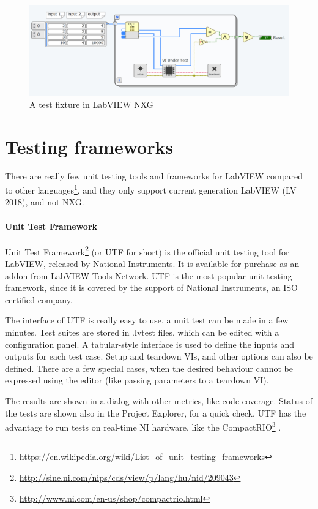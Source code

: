 \begin{figure}
\includegraphics[width=150mm,keepaspectratio]{figures/lv_testsuite.png}
\caption{A test fixture in LabVIEW NXG} 
\label{fig:selfmadetestfixture}
\end{figure}

\section{Testing frameworks}

There are really few unit testing tools and frameworks for LabVIEW compared to other languages\footnote{\url{https://en.wikipedia.org/wiki/List_of_unit_testing_frameworks}}, and they only support current generation LabVIEW (LV 2018), and not NXG.

\paragraph{Unit Test Framework}
Unit Test Framework\footnote{\url{http://sine.ni.com/nips/cds/view/p/lang/hu/nid/209043}} (or UTF for short) is the official unit testing tool for LabVIEW, released by National Instruments. It is available for purchase as an addon from LabVIEW Tools Network. UTF is the most popular unit testing framework, since it is covered by the support of National Instruments, an ISO certified company.

The interface of UTF is really easy to use, a unit test can be made in a few minutes. Test suites are stored in .lvtest files, which can be edited with a configuration panel. A tabular-style interface is used to define the inputs and outputs for each test case. Setup and teardown VIs, and other options can also be defined. There are a few special cases, when the desired behaviour cannot be expressed using the editor (like passing parameters to a teardown VI).

The results are shown in a dialog with other metrics, like code coverage. Status of the tests are shown also in the Project Explorer, for a quick check. UTF has the advantage to run tests on real-time NI hardware, like the CompactRIO\footnote{\url{http://www.ni.com/en-us/shop/compactrio.html}} \cite{labview_utf}. 
